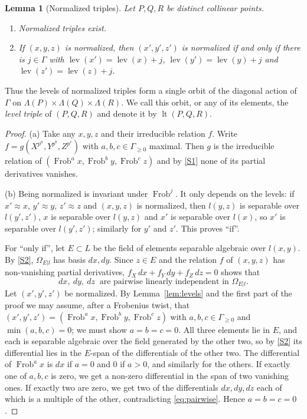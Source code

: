 \documentclass[11pt]{amsart}
\newtheorem{lemma}[theorem]{Lemma}
\theoremstyle{definition}
\theoremstyle{remark}
\newcommand{\Frob}{\operatorname{Frob}}
\newcommand{\lev}{\operatorname{lev}}
\newcommand{\lt}{\operatorname{lt}}
\begin{document}
\begin{lemma}[Normalized triples]\label{lem:normalized}
Let $P,Q,R$ be distinct collinear points.
\begin{enumerate}[label=\textup{(\alph*)}]
\item Normalized triples exist.
\item If $(x,y,z)$ is normalized, then $(x',y',z')$ is normalized if and only if there is $j\in\Gamma$ with
$\lev(x')=\lev(x)+j$, $\lev(y')=\lev(y)+j$ and $\lev(z')=\lev(z)+j$.
\end{enumerate}
\end{lemma}

Thus the levels of normalized triples form a single orbit of the diagonal action of $\Gamma$ on $\Lambda(P)\times\Lambda(Q)\times\Lambda(R)$.
We call this orbit, or any of its elements, the \emph{level triple} of $(P,Q,R)$ and denote it by $\lt(P,Q,R)$.

\begin{proof}
(a) Take any $x,y,z$ and their irreducible relation $f$. Write $f=g(X^{p^a},Y^{p^b},Z^{p^c})$ with $a,b,c\in\Gamma_{\ge0}$ maximal. Then $g$ is the irreducible relation of
$(\Frob^ax,\Frob^by,\Frob^cz)$ and by \ref{S1} none of its partial derivatives vanishes.

(b) Being normalized is invariant under $\Frob^j$. It only depends on the levels: if $x'\approx x$, $y'\approx y$, $z'\approx z$ and $(x,y,z)$ is normalized, then
$l(y,z)$ is separable over $l(y',z')$, $x$ is separable over $l(y,z)$ and $x'$ is separable over $l(x)$, so $x'$ is separable over $l(y',z')$; similarly for $y'$ and $z'$.
This proves ``if''.

For ``only if'', let $E\subset L$ be the field of elements separable algebraic over $l(x,y)$. By \ref{S2}, $\Omega_{E|l}$ has basis $dx,dy$.
Since $z\in E$ and the relation $f$ of $(x,y,z)$ has non-vanishing partial derivatives, $f_X\,dx+f_Y\,dy+f_Z\,dz=0$ shows that
\begin{equation}\label{eq:pairwise}
dx,\ dy,\ dz\ \text{ are pairwise linearly independent in }\Omega_{E|l}.
\end{equation}
Let $(x',y',z')$ be normalized. By Lemma~\ref{lem:levels} and the first part of the proof we may assume, after a Frobenius twist, that
$(x',y',z')=(\Frob^ax,\Frob^by,\Frob^cz)$ with $a,b,c\in\Gamma_{\ge0}$ and $\min(a,b,c)=0$; we must show $a=b=c=0$.
All three elements lie in $E$, and each is separable algebraic over the field generated by the other two, so by \ref{S2} its differential lies in the $E$-span of the differentials of the other two.
The differential of $\Frob^ax$ is $dx$ if $a=0$ and $0$ if $a>0$, and similarly for the others.
If exactly one of $a,b,c$ is zero, we get a non-zero differential in the span of two vanishing ones. If exactly two are zero, we get two of the differentials $dx,dy,dz$ each of which is a multiple of the other,
contradicting \eqref{eq:pairwise}. Hence $a=b=c=0$.
\end{proof}
\end{document}
